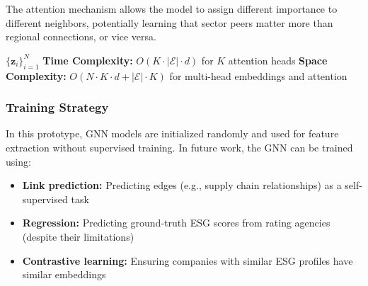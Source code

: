 The attention mechanism allows the model to assign different importance to different neighbors, potentially learning that sector peers matter more than regional connections, or vice versa.

\begin{algorithm}[H]
\caption{Graph Attention Network (GAT) for ESG Embeddings}
\label{alg:gat}
\BlankLine
{}
\Return $\{\mathbf{z}_i\}_{i=1}^N$\;
\BlankLine
\textbf{Time Complexity:} $O(K \cdot |\mathcal{E}| \cdot d)$ for $K$ attention heads\;
\textbf{Space Complexity:} $O(N \cdot K \cdot d + |\mathcal{E}| \cdot K)$ for multi-head embeddings and attention\;
\end{algorithm}

\subsubsection{Training Strategy}

In this prototype, GNN models are initialized randomly and used for feature extraction without supervised training. In future work, the GNN can be trained using:
\begin{itemize}
\item \textbf{Link prediction:} Predicting edges (e.g., supply chain relationships) as a self-supervised task
\item \textbf{Regression:} Predicting ground-truth ESG scores from rating agencies (despite their limitations)
\item \textbf{Contrastive learning:} Ensuring companies with similar ESG profiles have similar embeddings
\end{itemize}

